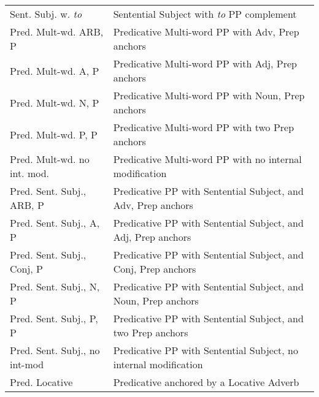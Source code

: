\begin{tabular}{ll}
Sent. Subj. w. {\it to} & Sentential Subject with {\it to} PP complement \\
Pred. Mult-wd. ARB, P & Predicative Multi-word PP with Adv, Prep anchors\\
Pred. Mult-wd. A, P & Predicative Multi-word PP with Adj, Prep anchors\\
Pred. Mult-wd. N, P & Predicative Multi-word PP with Noun, Prep
anchors\\
Pred. Mult-wd. P, P & Predicative Multi-word PP with two Prep
anchors\\
Pred. Mult-wd. no int. mod. & Predicative Multi-word PP with no internal
modification\\
Pred. Sent. Subj., ARB, P & Predicative PP with Sentential Subject, and
Adv, Prep anchors\\
Pred. Sent. Subj., A, P & Predicative PP with Sentential Subject, and
Adj, Prep anchors\\
Pred. Sent. Subj., Conj, P & Predicative PP with Sentential Subject, and
Conj, Prep anchors\\
Pred. Sent. Subj., N, P & Predicative PP with Sentential Subject, and
Noun, Prep anchors\\
Pred. Sent. Subj., P, P & Predicative PP with Sentential Subject, and two
Prep anchors\\
Pred. Sent. Subj., no int-mod & Predicative PP with Sentential Subject,
no internal modification\\
Pred. Locative & Predicative anchored by a Locative Adverb

\end{tabular}
\normalsize
















